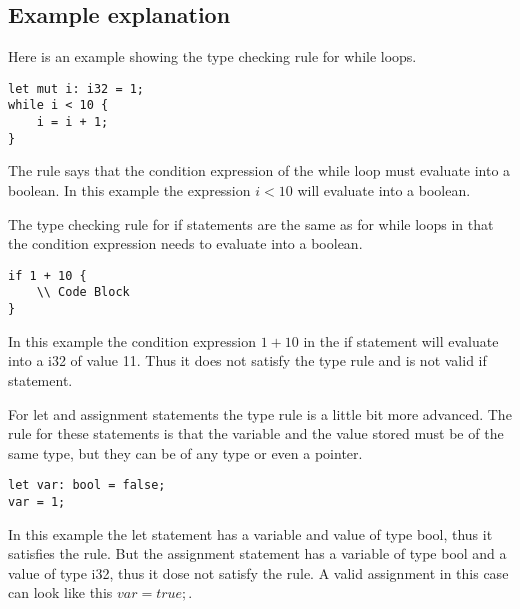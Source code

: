 \documentclass[12pt]{article}
\begin{document}
%
%
%
%


	\subsection{Example explanation}
	Here is an example showing the type checking rule for while loops.
    	\begin{verbatim}
let mut i: i32 = 1;
while i < 10 {
    i = i + 1;
}
    	\end{verbatim}
	The rule says that the condition expression of the while loop must evaluate into a boolean. In this example the expression $i < 10$ will evaluate into a boolean.

	The type checking rule for if statements are the same as for while loops in that the condition expression needs to evaluate into a boolean. 
    	\begin{verbatim}
if 1 + 10 {
    \\ Code Block
}
    	\end{verbatim}
	In this example the condition expression $1 + 10$ in the if statement will evaluate into a i32 of value 11. Thus it does not satisfy the type rule and is not valid if statement.

	For let and assignment statements the type rule is a little bit more advanced. The rule for these statements is that the variable and the value stored must be of the same type, but they can be of any type or even a pointer.
    	\begin{verbatim}
let var: bool = false;
var = 1;
    	\end{verbatim}
	In this example the let statement has a variable and value of type bool, thus it satisfies the rule. But the assignment statement has a variable of type bool and a value of type i32, thus it dose not satisfy the rule. A valid assignment in this case can look like this $var = true;$.
\end{document}
